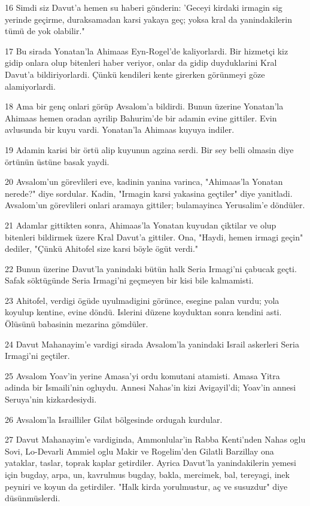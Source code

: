 \par 16 Simdi siz Davut'a hemen su haberi gönderin: 'Geceyi kirdaki irmagin sig yerinde geçirme, duraksamadan karsi yakaya geç; yoksa kral da yanindakilerin tümü de yok olabilir."
\par 17 Bu sirada Yonatan'la Ahimaas Eyn-Rogel'de kaliyorlardi. Bir hizmetçi kiz gidip onlara olup bitenleri haber veriyor, onlar da gidip duyduklarini Kral Davut'a bildiriyorlardi. Çünkü kendileri kente girerken görünmeyi göze alamiyorlardi.
\par 18 Ama bir genç onlari görüp Avsalom'a bildirdi. Bunun üzerine Yonatan'la Ahimaas hemen oradan ayrilip Bahurim'de bir adamin evine gittiler. Evin avlusunda bir kuyu vardi. Yonatan'la Ahimaas kuyuya indiler.
\par 19 Adamin karisi bir örtü alip kuyunun agzina serdi. Bir sey belli olmasin diye örtünün üstüne basak yaydi.
\par 20 Avsalom'un görevlileri eve, kadinin yanina varinca, "Ahimaas'la Yonatan nerede?" diye sordular. Kadin, "Irmagin karsi yakasina geçtiler" diye yanitladi. Avsalom'un görevlileri onlari aramaya gittiler; bulamayinca Yerusalim'e döndüler.
\par 21 Adamlar gittikten sonra, Ahimaas'la Yonatan kuyudan çiktilar ve olup bitenleri bildirmek üzere Kral Davut'a gittiler. Ona, "Haydi, hemen irmagi geçin" dediler, "Çünkü Ahitofel size karsi böyle ögüt verdi."
\par 22 Bunun üzerine Davut'la yanindaki bütün halk Seria Irmagi'ni çabucak geçti. Safak söktügünde Seria Irmagi'ni geçmeyen bir kisi bile kalmamisti.
\par 23 Ahitofel, verdigi ögüde uyulmadigini görünce, esegine palan vurdu; yola koyulup kentine, evine döndü. Islerini düzene koyduktan sonra kendini asti. Ölüsünü babasinin mezarina gömdüler.
\par 24 Davut Mahanayim'e vardigi sirada Avsalom'la yanindaki Israil askerleri Seria Irmagi'ni geçtiler.
\par 25 Avsalom Yoav'in yerine Amasa'yi ordu komutani atamisti. Amasa Yitra adinda bir Ismaili'nin ogluydu. Annesi Nahas'in kizi Avigayil'di; Yoav'in annesi Seruya'nin kizkardesiydi.
\par 26 Avsalom'la Israilliler Gilat bölgesinde ordugah kurdular.
\par 27 Davut Mahanayim'e vardiginda, Ammonlular'in Rabba Kenti'nden Nahas oglu Sovi, Lo-Devarli Ammiel oglu Makir ve Rogelim'den Gilatli Barzillay ona yataklar, taslar, toprak kaplar getirdiler. Ayrica Davut'la yanindakilerin yemesi için bugday, arpa, un, kavrulmus bugday, bakla, mercimek, bal, tereyagi, inek peyniri ve koyun da getirdiler. "Halk kirda yorulmustur, aç ve susuzdur" diye düsünmüslerdi.


